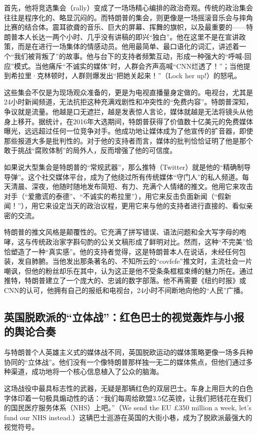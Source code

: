 首先，他将竞选集会（rally）变成了一场场精心编排的政治奇观。传统的政治集会往往是程序化的、略显沉闷的。而特朗普的集会，则更像是一场摇滚音乐会与摔角比赛的结合体。震耳欲聋的音乐、巨大的屏幕、挥舞的旗帜，以及最重要的——特朗普本人长达一两个小时、几乎没有讲稿的即兴“独白”。他在这里不是在宣讲政策，而是在进行一场集体的情感动员。他用最简单、最口语化的词汇，讲述着一个“我们被背叛了”的故事。他与台下的支持者频繁互动，形成一种强大的“呼喊-回应”模式。当他痛斥“不诚实的媒体”时，人群会齐声高喊“CNN烂透了！”；当他提到希拉里·克林顿时，人群则爆发出“把她关起来！”（Lock her up!）的怒吼。

这些集会不仅是为现场观众准备的，更是为电视直播量身定做的。电视台，尤其是24小时新闻频道，无法抗拒这种充满戏剧性和冲突性的“免费内容”。特朗普深知，争议就是流量。他越是口无遮拦，越是发表惊人言论，媒体就越是无法将镜头从他身上移开。据统计，在2016年大选期间，特朗普获得了价值数十亿美元的免费媒体曝光，远远超过任何一位竞争对手。他成功地让媒体成为了他宣传的扩音器，即使那些报道大多是批判性的。对于他的支持者而言，媒体的批判恰恰证明了他是那个敢于挑战“腐败体制”的局外人，反而增强了他的可信度。

如果说大型集会是特朗普的“常规武器”，那么推特（Twitter）就是他的“精确制导导弹”。这个社交媒体平台，成为了他绕过所有传统媒体“守门人”的私人频道。每天清晨、深夜，他随时随地发布简短、有力、充满个人情绪的推文。他用它来攻击对手（“爱撒谎的泰德”、“不诚实的希拉里”），用它来反击负面新闻（“假新闻！”），用它来设定当天的政治议程，更用它来与他的支持者进行直接的、看似亲密的交流。

特朗普的推文风格是颠覆性的。它充满了拼写错误、语法问题和全大写字母的咆哮，这与传统政治家字斟句酌的公关文稿形成了鲜明对比。然而，这种“不完美”恰恰塑造了一种“真实感”。他的支持者觉得，这是特朗普本人在说话，未经任何包装，发自肺腑。当他发出那条著名的、不知所云的“covfefe”推文时，主流社会一片嘲讽，但他的粉丝却乐在其中，认为这正是他不受条条框框束缚的魅力所在。通过推特，特朗普建立了一个庞大的、忠诚的数字部落。他不再需要《纽约时报》或CNN的认可，他拥有自己的报纸和电视台，24小时不间断地向他的“人民”广播。

\subsection{英国脱欧派的“立体战”：红色巴士的视觉轰炸与小报的舆论合奏}

与特朗普个人英雄主义式的媒体战不同，英国脱欧运动的媒体策略更像一场多兵种协同的“立体战”。他们没有一个像特朗普那样独一无二的媒体焦点，但他们通过多种渠道，成功地将一个核心信息植入了公众的脑海。

这场战役中最具标志性的武器，无疑是那辆红色的双层巴士。车身上用巨大的白色字体印着一句极具煽动性的话：“我们每周给欧盟3.5亿英镑，让我们把钱花在我们的国民医疗服务体系（NHS）上吧。”（We send the EU £350 million a week, let's fund our NHS instead.）这辆巴士巡游在英国的大街小巷，成为了脱欧派最强大的视觉符号。

